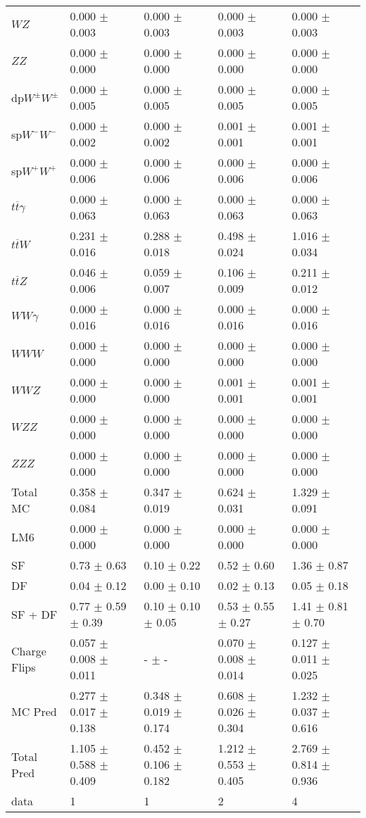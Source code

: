 \begin{tabular}{l | l l l l}
$WZ$ &  0.000 $\pm$  0.003 &  0.000 $\pm$  0.003 &  0.000 $\pm$  0.003 &  0.000 $\pm$  0.003\\
$ZZ$ &  0.000 $\pm$   0.000 &  0.000 $\pm$   0.000 &  0.000 $\pm$   0.000 &  0.000 $\pm$   0.000\\
\hline
dp$W^{\pm}W^{\pm}$ &  0.000 $\pm$  0.005 &  0.000 $\pm$  0.005 &  0.000 $\pm$  0.005 &  0.000 $\pm$  0.005\\
sp$W^{-}W^{-}$ &  0.000 $\pm$  0.002 &  0.000 $\pm$  0.002 &  0.001 $\pm$  0.001 &  0.001 $\pm$  0.001\\
sp$W^{+}W^{+}$ &  0.000 $\pm$  0.006 &  0.000 $\pm$  0.006 &  0.000 $\pm$  0.006 &  0.000 $\pm$  0.006\\
$t\overline{t}\gamma$ &  0.000 $\pm$  0.063 &  0.000 $\pm$  0.063 &  0.000 $\pm$  0.063 &  0.000 $\pm$  0.063\\
$t\overline{t}W$ &  0.231 $\pm$  0.016 &  0.288 $\pm$  0.018 &  0.498 $\pm$  0.024 &  1.016 $\pm$  0.034\\
$t\overline{t}Z$ &  0.046 $\pm$  0.006 &  0.059 $\pm$  0.007 &  0.106 $\pm$  0.009 &  0.211 $\pm$  0.012\\
$WW\gamma$ &  0.000 $\pm$  0.016 &  0.000 $\pm$  0.016 &  0.000 $\pm$  0.016 &  0.000 $\pm$  0.016\\
$WWW$ &   0.000 $\pm$   0.000 &   0.000 $\pm$   0.000 &   0.000 $\pm$   0.000 &   0.000 $\pm$   0.000\\
$WWZ$ &  0.000 $\pm$   0.000 &  0.000 $\pm$   0.000 &  0.001 $\pm$  0.001 &  0.001 $\pm$  0.001\\
$WZZ$ &   0.000 $\pm$   0.000 &   0.000 $\pm$   0.000 &  0.000 $\pm$   0.000 &   0.000 $\pm$   0.000\\
$ZZZ$ &   0.000 $\pm$   0.000 &   0.000 $\pm$   0.000 &   0.000 $\pm$   0.000 &   0.000 $\pm$   0.000\\
\hline
Total MC &  0.358 $\pm$  0.084 &  0.347 $\pm$  0.019 &  0.624 $\pm$  0.031 &  1.329 $\pm$  0.091\\
\hline\hline
\hline
LM6 &  0.000 $\pm$  0.000 &  0.000 $\pm$  0.000 &  0.000 $\pm$  0.000 &  0.000 $\pm$  0.000\\
\hline\hline
\hline\hline
 SF  & 0.73 $\pm$ 0.63 & 0.10 $\pm$ 0.22 & 0.52 $\pm$ 0.60 & 1.36 $\pm$ 0.87\\
 DF  & 0.04 $\pm$ 0.12 & 0.00 $\pm$ 0.10 & 0.02 $\pm$ 0.13 & 0.05 $\pm$ 0.18\\
\hline
 SF + DF  & 0.77 $\pm$ 0.59 $\pm$ 0.39 & 0.10 $\pm$ 0.10 $\pm$ 0.05 & 0.53 $\pm$ 0.55 $\pm$ 0.27 & 1.41 $\pm$ 0.81 $\pm$ 0.70\\
\hline\hline
Charge Flips & 0.057 $\pm$ 0.008 $\pm$ 0.011 & - $\pm$ - & 0.070 $\pm$ 0.008 $\pm$ 0.014 & 0.127 $\pm$ 0.011 $\pm$ 0.025\\
\hline\hline
\hline
MC Pred &  0.277 $\pm$  0.017 $\pm$  0.138 &  0.348 $\pm$  0.019 $\pm$  0.174 &  0.608 $\pm$  0.026 $\pm$  0.304 &  1.232 $\pm$  0.037 $\pm$  0.616\\
\hline\hline
Total Pred &  1.105 $\pm$  0.588 $\pm$  0.409 &  0.452 $\pm$  0.106 $\pm$  0.182 &  1.212 $\pm$  0.553 $\pm$  0.405 &  2.769 $\pm$  0.814 $\pm$  0.936\\
\hline\hline
data & 1 & 1 & 2 & 4\\
\hline\hline
\end{tabular}

